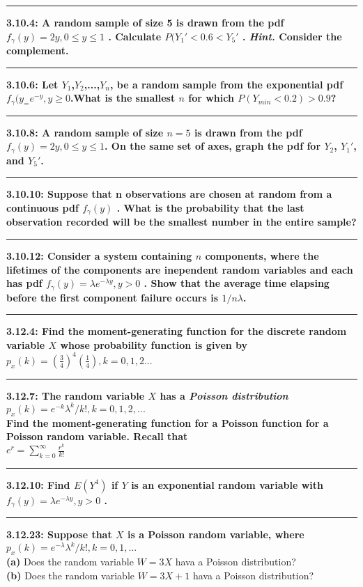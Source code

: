 \documentclass[11pt]{article}
\newcommand\question[2]{\vspace{.25in}\hrule\textbf{#1: #2}\vspace{.5em}\vspace{.10in}}
\renewcommand\part[1]{\vspace{.10in}\textbf{(#1)}}
\begin{document}
\raggedright
\newcommand\NAME{Jonathan Lopez}  %
\newcommand\HWNUM{4}              %



\question{3.10.4}
{A random sample of size 5 is drawn from the pdf
    $f_{\gamma}(y)=2y, 0 \leq y \leq 1$
. Calculate
$P(Y_{1}' < 0.6 < Y_{5}'$
. \emph{Hint.} Consider the complement.}


\question{3.10.6}
{Let $Y_{1}$,$Y_{2}$,...,$Y_{n}$, be a random sample from the exponential pdf
$f_{\gamma}(y_ = e^{-y},y \geq 0$.What is the smallest $n$ for which
$P(Y_{min} < 0.2) > 0.9$?
}


\question{3.10.8}
{A random sample of size $n = 5$ is drawn from the pdf
$f_{\gamma}(y) = 2y, 0 \leq y \leq 1$.
On the same set of axes, graph the pdf for
$Y_{2}$, $Y_{1}'$, and $Y_{5}'$.}


\question{3.10.10}
{Suppose that n observations are chosen at random from a continuous pdf
$f_{\gamma}(y)$
. What is the probability that the last observation recorded will be the smallest
number in the entire sample?}


\question{3.10.12}
{Consider a system containing $n$ components, where the lifetimes of the 
components are inependent random variables and each has pdf
$f_{\gamma}(y) = \lambda e^{- \lambda y}, y > 0$
. Show that the average time elapsing before the first component failure occurs
is $1/n \lambda $.}


\question{3.12.4}
{Find the moment-generating function for the discrete random variable $X$
whose probability function is given by
$p_{x}(k) = (\frac{3}{4})^{4}(\frac{1}{4}), k = 0,1,2...$}


\question{3.12.7}
{The random variable $X$ has a \emph{Poisson distribution}
$p_{x}(k) = e^{-k}\lambda ^{k}/k!, k=0,1,2,...$
\\
Find the moment-generating function for a Poisson function for a Poisson
random variable. Recall that
\\
$e^{r}=\sum_{k=0}^{\infty}\frac{r^{k}}{k!}$}


\question{3.12.10}
{Find $E(Y^{4})$ if $Y$ is an exponential random variable with
$f_{\gamma}(y) = \lambda e^{- \lambda y}, y>0$
.}


\question{3.12.23}
{Suppose that $X$ is a Poisson random variable, where
$p_{x}(k) = e^{-\lambda}\lambda^{k}/k!,k=0,1,...$}
\\
\part{a}
{Does the random variable $W = 3X$ hava a Poisson distribution?}
\\ 
\part{b}
{Does the random variable $W = 3X+1$ hava a Poisson distribution?}
\end{document}
